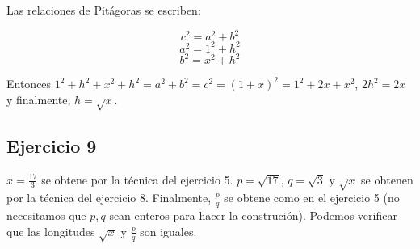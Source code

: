 Las relaciones de Pitágoras se escriben:

$$c^2 = a^2 + b^2$$
$$a^2 = 1^2 + h^2$$
$$b^2 = x^2 + h^2$$

Entonces
${1^2+h^2 + x^2 + h^2} = a^2 + b^2 = c^2 = {(1+x)}^2 = 1^2+2x+x^2$,
$2h^2 = 2x$ y finalmente, $h = \sqrt{x}$.

\subsection{Ejercicio 9}

$x = \frac{17}{3}$ se obtene por la técnica del ejercicio 5.
$p = \sqrt{17}$, $q=\sqrt{3}$ y $\sqrt{x}$ se obtenen por la técnica del
ejercicio 8. Finalmente, $\frac{p}{q}$ se obtene como en el ejercicio 5
(no necesitamos que $p,q$ sean enteros para hacer la construción). Podemos
verificar que las longitudes $\sqrt{x}$ y $\frac{p}{q}$ son iguales.

